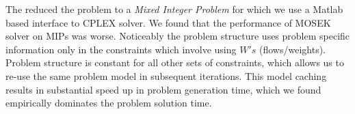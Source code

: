 The reduced the problem to a \textit{Mixed Integer Problem} for which we use a 
Matlab based interface to CPLEX solver. We found that the performance of MOSEK 
solver on MIPs was worse. Noticeably the problem structure uses problem specific information only in the constraints which involve using $W's$ (flows/weights). Problem
structure is constant for all other sets of constraints, which allows us to re-use the 
same problem model in subsequent iterations. This model caching results in
substantial speed up in problem generation time, which we found empirically 
dominates the problem solution time. 
